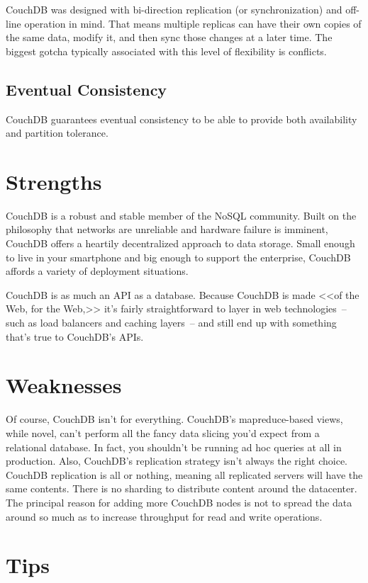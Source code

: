 CouchDB was designed with bi-direction replication (or synchronization) and off-line operation in mind. That means multiple replicas can have their own copies of the same data, modify it, and then sync those changes at a later time. The biggest gotcha typically associated with this level of flexibility is conflicts.

\subsection{Eventual Consistency}

CouchDB guarantees eventual consistency to be able to provide both availability and partition tolerance.

\section{Strengths}

CouchDB is a robust and stable member of the NoSQL community. Built on the philosophy that networks are unreliable and hardware failure is imminent, CouchDB offers a heartily decentralized approach to data storage. Small enough to live in your smartphone and big enough to support the enterprise, CouchDB affords a variety of deployment situations.

CouchDB is as much an API as a database. Because CouchDB is made <<of the Web, for the Web,>> it’s fairly straightforward to layer in web technologies~-- such as load balancers and caching layers~-- and still end up with something that's true to CouchDB's APIs.\cite{seven_databases}

\section{Weaknesses}

Of course, CouchDB isn't for everything. CouchDB's mapreduce-based views, while novel, can't perform all the fancy data slicing you'd expect from a relational database. In fact, you shouldn't be running ad hoc queries at all in production. Also, CouchDB's replication strategy isn't always the right choice. CouchDB replication is all or nothing, meaning all replicated servers will have the same contents. There is no sharding to distribute content around the datacenter. The principal reason for adding more CouchDB nodes is not to spread the data around so much as to increase throughput for read and write operations.\cite{seven_databases}

\section{Tips}

